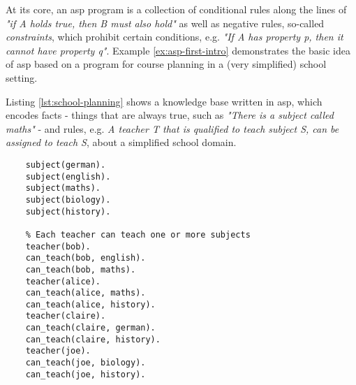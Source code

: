 At its core, an \gls{asp} program is a collection of conditional rules along the lines of \emph{"if A holds true, then B must also hold"} as well as negative rules, so-called \emph{constraints}, which prohibit certain conditions, e.g. \emph{"If A has property p, then it cannot have property q"}. Example \ref{ex:asp-first-intro} demonstrates the basic idea of \gls{asp} based on a program for course planning in a (very simplified) school setting.
\begin{example}
\label{ex:asp-first-intro}
Listing \ref{lst:school-planning} shows a knowledge base written in \gls{asp}, which encodes facts - things that are always true, such as \emph{"There is a subject called maths"} - and rules, e.g. \emph{A teacher T that is qualified to teach subject S, can be assigned to teach S}, about a simplified school domain.
\begin{lstlisting}[style=asp-code, caption=School planning in ASP, label={lst:school-planning}]
    % The curriculum consists of different courses.
    subject(german).
    subject(english).
    subject(maths).
    subject(biology).
    subject(history).

    % Each teacher can teach one or more subjects
    teacher(bob).
    can_teach(bob, english).
    can_teach(bob, maths).
    teacher(alice).
    can_teach(alice, maths).
    can_teach(alice, history).
    teacher(claire).
    can_teach(claire, german).
    can_teach(claire, history).
    teacher(joe).
    can_teach(joe, biology).
    can_teach(joe, history).


\end{lstlisting}
\end{example}
